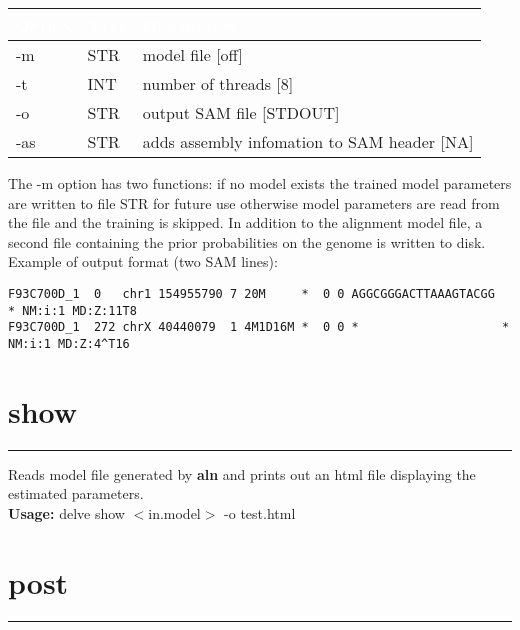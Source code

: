 \documentclass[11pt,a4paper,oneside]{book}
\begin{document}

\begin{center}
\begin{tabular}{| l | l | p{12cm}|}
\hline
\rowcolor{blue} \textcolor{white}{\scshape Option}		&\textcolor{white}{\scshape Type}		&	\textcolor{white}{\scshape Description}\\ \hline
-m & STR & model file [off] \\
-t & INT & number of threads [8]\\
-o & STR & output SAM file [STDOUT]\\
-as & STR & adds assembly infomation to SAM header [NA]\\
\hline
\end{tabular}
\end{center}

The -m option has two functions: if no model exists the trained model parameters are written to file STR for future use otherwise model parameters are read from the file and the training is skipped. In addition to the alignment model file, a second file containing the prior probabilities on the genome is written to disk.  \\

Example of output format (two SAM lines): 

{\small
\begin{verbatim}
F93C700D_1	0   chr1 154955790 7 20M     *	0 0 AGGCGGGACTTAAAGTACGG	* NM:i:1 MD:Z:11T8
F93C700D_1	272	chrX 40440079  1 4M1D16M *	0 0 *                    * NM:i:1 MD:Z:4^T16

\end{verbatim}
}


\newpage
\section{show}
\rule[1cm]{\textwidth}{1pt}

Reads model file generated by {\bf aln} and prints out an html file displaying the estimated parameters.\\

{\bf Usage:} delve show  $<$in.model$>$  -o test.html\\



\section{post}
\rule[1cm]{\textwidth}{1pt}
\end{document}
